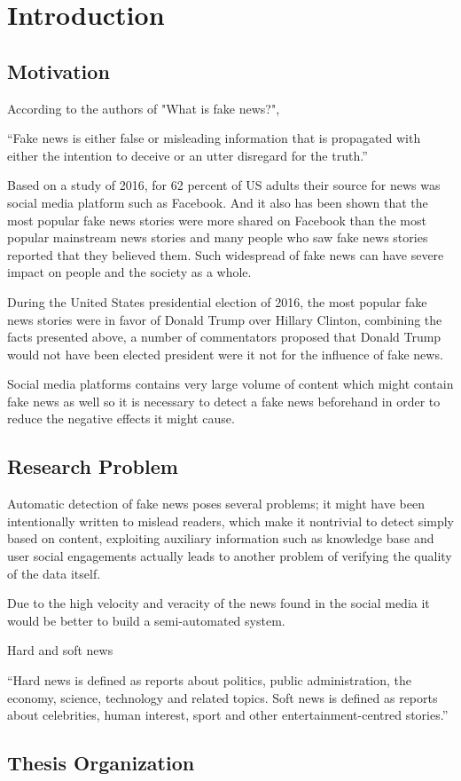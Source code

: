 \chapter{Introduction}\label{introduction}

\section{Motivation}\label{intro:motivation}
According to the authors of "What is fake news?"\cite{jasterfake}, 

\enquote{Fake news is either false or misleading information that is propagated with either the intention to deceive or an utter disregard for the truth.}

Based on a study of 2016, for 62 percent of US adults their source for news was social media platform such as Facebook\cite{gottfried2016news}. And it also has been shown that the most popular fake news stories
were more shared on Facebook than the most popular mainstream news stories\cite{silverman2016analysis} and many people who saw fake news stories reported that they believed them\cite{silverman2016most}. Such widespread of fake 
news can have severe impact on people and the society as a whole.  

During the United States presidential election of 2016, the most popular fake news stories were in favor of Donald Trump over Hillary Clinton\cite{silverman2016analysis}, combining the facts presented above, a number of commentators proposed that Donald Trump would not have been elected president were it not for the influence of fake news\cite{parkinson2016click}\cite{read2016donald}\cite{dewey2016facebook}.

Social media platforms contains very large volume of content which might contain fake news as well so it is necessary to detect a fake news beforehand in order to reduce the negative effects it might cause.

\section{Research Problem} \label{intro:research}
Automatic detection of fake news poses several problems; it might have been intentionally written to mislead readers, which make it nontrivial to detect simply based on content, exploiting auxiliary information such as knowledge base and user social engagements actually leads to another problem of verifying the quality of the data itself\cite{shu2017fake}.

Due to the high velocity and veracity of the news found in the social media it would be better to build a semi-automated system\cite{wiegand2016veracity}.

Hard and soft news \cite{reinemann2012hard}

\enquote{Hard news is defined as reports about politics, public administration, the economy, science, technology and
related topics. Soft news is defined as reports about celebrities, human interest, sport and
other entertainment-centred stories.}

\section{Thesis Organization} \label{intro:organization}